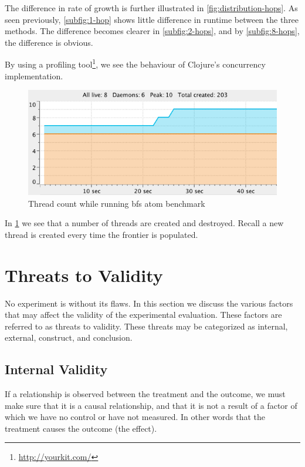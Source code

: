 				
				The difference in rate of growth is further illustrated in \cref{fig:distribution-hops}.  As seen previously, \cref{subfig:1-hop} shows little difference in runtime between the three methods.  The difference becomes clearer in \cref{subfig:2-hops}, and by \cref{subfig:8-hops}, the difference is obvious.
				
				By using a profiling tool\footnote{\url{http://yourkit.com/}}, we see the behaviour of Clojure's concurrency implementation.
				
				\begin{figure}
					\centering
					
					\includegraphics{figures/images/threads}
					
					\caption{Thread count while running \gls{bfs} atom benchmark}
					\label{fig:runtime-threads}
				\end{figure}
				
				In \cref{fig:runtime-threads} we see that a number of threads are created and destroyed.  Recall a new thread is created every time the frontier is populated.
	
	\section{Threats to Validity}
	\label{sec:threats-to-validity}
		No experiment is without its flaws.  In this section we discuss the various factors that may affect the validity of the experimental evaluation.  These factors are referred to as threats to validity.  These threats may be categorized as internal, external, construct, and conclusion.
		
		\subsection{Internal Validity}
		\label{sec:internal-validity}
			\begin{displayquote}
				If a relationship is observed between the treatment and the outcome, we must make sure that it is a causal relationship, and that it is not a result of a factor of which we have no control or have not measured. In other words that the treatment causes the outcome (the effect).
			\end{displayquote}
		
